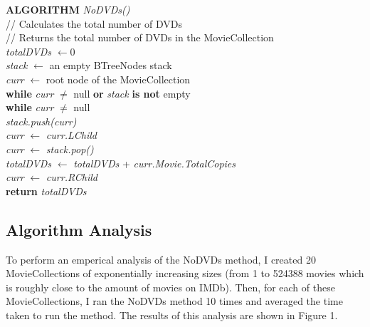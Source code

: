\documentclass[12pt,a4paper]{article}
\begin{document}
			\textbf{ALGORITHM} \textit{NoDVDs()}\\
			\null\hspace{1cm}// Calculates the total number of DVDs\\
			\null\hspace{1cm}// Returns the total number of DVDs in the MovieCollection\\
			\null\hspace{1cm}\textit{totalDVDs} $\leftarrow 0$\\
			\null\hspace{1cm}\textit{stack} $\leftarrow$ an empty BTreeNodes stack\\
			\null\hspace{1cm}\textit{curr} $\leftarrow$ root node of the MovieCollection\\
			\null\hspace{1cm}\textbf{while} \textit{curr} $\neq$ null \textbf{or} 
			\textit{stack} \textbf{is not} empty\\
			\null\hspace{2cm}\textbf{while} \textit{curr} $\neq$ null\\
			\null\hspace{3cm}\textit{stack.push(curr)}\\
			\null\hspace{3cm}\textit{curr} $\leftarrow$ \textit{curr.LChild}\\
			\null\hspace{2cm}\textit{curr} $\leftarrow$ \textit{stack.pop()}\\
			\null\hspace{2cm}\textit{totalDVDs} $\leftarrow$ \textit{totalDVDs} + 
			\textit{curr.Movie.TotalCopies}\\
			\null\hspace{2cm}\textit{curr} $\leftarrow$ \textit{curr.RChild}\\
			\null\hspace{1cm}\textbf{return} \textit{totalDVDs}

		\newpage

		\subsection{Algorithm Analysis}
			To perform an emperical analysis of the NoDVDs method, I created 20 
			MovieCollections of exponentially increasing sizes (from 1 to 524388 
			movies which is roughly close to the amount of movies on IMDb). Then, 
			for each of these MovieCollections, I ran the NoDVDs method 10 times 
			and averaged the time taken to run the method. The results of this 
			analysis are shown in Figure 1.\\
\end{document}
